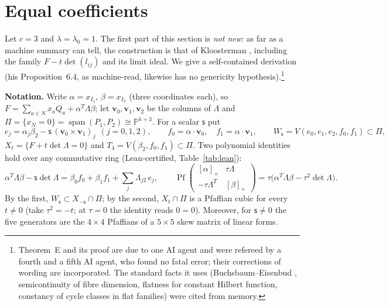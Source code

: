 \documentclass[10pt]{article}
\numberwithin{equation}{section}
\theoremstyle{remark}
\newcommand{\PP}{\mathbb{P}}
\newcommand{\Pf}{\operatorname{Pf}}
\newcommand{\run}[1]{\medskip\noindent\textbf{#1}}
\begin{document}
\section{Equal coefficients}\label{sec:E}
Let $c=3$ and $\lambda=\lambda_0=1$. The first part of this section is \emph{not new}: as far as a machine
summary can tell, the construction is that of Kloosterman \cite[Prop.~6.4, Cor.~6.5]{Kl1}, including the family
$F-t\det(l_{ij})$ and its limit ideal. We give a self-contained derivation (his Proposition~6.4, as machine-read,
likewise has no genericity hypothesis).\footnote{Theorem~E
and its proof are due to one AI agent and were refereed by a fourth and a fifth AI agent, who found no fatal
error; their corrections of wording are incorporated. The standard facts it uses
(Buchsbaum--Eisenbud \cite{BE}, semicontinuity of fibre dimension, flatness for constant Hilbert function,
constancy of cycle classes in flat families) were cited from memory.}

\run{Notation.} Write $\alpha=x_{I_1}$, $\beta=x_{I_2}$ (three coordinates each), so
$F=\sum_{a\in N}x_aQ_a+\alpha^T\Lambda\beta$; let $\mathbf v_0,\mathbf v_1,\mathbf v_2$ be the columns of
$\Lambda$ and $\Pi=\{x_N=0\}=\operatorname{span}(P_1,P_2)\cong\PP^{k+3}$. For a scalar $\mathsf s$ put
\[
e_j=\alpha_j\beta_2-\mathsf s\,(\mathbf v_0\times\mathbf v_1)_j\ \ (j=0,1,2),\qquad
f_0=\alpha\cdot\mathbf v_0,\quad f_1=\alpha\cdot\mathbf v_1,\qquad
W_{\mathsf s}=V(e_0,e_1,e_2,f_0,f_1)\subset\Pi,
\]
$X_t=\{F+t\det\Lambda=0\}$ and $T_4=V(\beta_2,f_0,f_1)\subset\Pi$. Two polynomial identities hold over any
commutative ring (Lean-certified, Table~\ref{tab:lean}):
\begin{equation}\label{eq:pf}
\alpha^T\Lambda\beta-\mathsf s\det\Lambda=\beta_0f_0+\beta_1f_1+\sum_j\Lambda_{j2}\,e_j,\qquad
\Pf\begin{pmatrix}[\alpha]_\times&\tau\Lambda\\-\tau\Lambda^T&[\beta]_\times\end{pmatrix}
=\tau\bigl(\alpha^T\Lambda\beta-\tau^2\det\Lambda\bigr).
\end{equation}
By the first, $W_{\mathsf s}\subset X_{-\mathsf s}\cap\Pi$; by the second, $X_t\cap\Pi$ is a Pfaffian cubic for
every $t\neq0$ (take $\tau^2=-t$; at $\tau=0$ the identity reads $0=0$). Moreover, for $\mathsf s\ne0$ the five
generators are the $4\times4$ Pfaffians of a $5\times5$ skew
matrix of linear forms.
\end{document}
